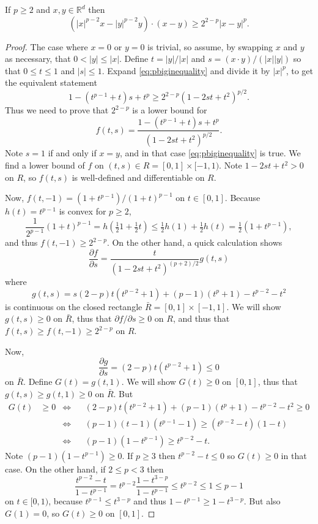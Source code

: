\documentclass[final,leqno,onefignum,onetabnum]{siamltex1213bueler}
\newcommand\RR{\mathbb{R}}
\begin{document}
\begin{lemma}  \label{lem:pbiginequality}  If $p\ge 2$ and $x,y\in\RR^d$ then
\begin{equation}
\left(|x|^{p-2} x - |y|^{p-2} y\right)\cdot(x-y) \ge 2^{2-p} |x-y|^p. \label{eq:pbiginequality}
\end{equation}
\end{lemma}

\begin{proof}  The case where $x=0$ or $y=0$ is trivial, so assume, by swapping $x$ and $y$ as necessary, that $0 < |y| \le |x|$.  Define $t=|y|/|x|$ and $s = (x\cdot y)/(|x||y|)$ so that $0\le t \le 1$ and $|s|\le 1$.  Expand \eqref{eq:pbiginequality} and divide it by $|x|^p$, to get the equivalent statement
    $$1 - (t^{p-1}+t) s + t^p \ge 2^{2-p} \left(1 - 2 s t + t^2\right)^{p/2}.$$
Thus we need to prove that $2^{2-p}$ is a lower bound for
	$$f(t,s) = \frac{1 - (t^{p-1}+t) s + t^p}{\left(1 - 2 s t + t^2\right)^{p/2}}.$$
Note $s=1$ if and only if $x=y$, and in that case \eqref{eq:pbiginequality} is true.  We find a lower bound of $f$ on $(t,s) \in R=[0,1]\times[-1,1)$.  Note $1-2st+t^2 > 0$ on $ R$, so $f(t,s)$ is well-defined and differentiable on $R$.

Now, $f(t,-1) = \left(1 + t^{p-1}\right) / \left(1 + t\right)^{p-1}$ on $t\in[0,1]$.  Because $h(t)=t^{p-1}$ is convex for $p \ge 2$,
    $$\frac{1}{2^{p-1}} (1+t)^{p-1} = h(\tfrac{1}{2} 1 + \tfrac{1}{2} t) \le \tfrac{1}{2} h(1) + \tfrac{1}{2} h(t) = \tfrac{1}{2} (1 + t^{p-1}),$$
and thus $f(t,-1) \ge 2^{2-p}$.  On the other hand, a quick calculation shows
    $$\frac{\partial f}{\partial s} = \frac{t}{\left(1 - 2 s t + t^2\right)^{(p+2)/2}} g(t,s)$$
where
    $$g(t,s) = s(2-p) t (t^{p-2} + 1) + (p-1) (t^p+1) - t^{p-2} - t^2$$
is continuous on the closed rectangle $\bar R = [0,1]\times[-1,1]$.  We will show $g(t,s)\ge 0$ on $\bar R$, thus that $\partial f/\partial s \ge 0$ on $R$, and thus that $f(t,s)\ge f(t,-1) \ge  2^{2-p}$ on $R$.

Now,
    $$\frac{\partial g}{\partial s} = (2-p) t (t^{p-2} + 1) \le 0$$
on $\bar R$.  Define $G(t) = g(t,1)$.  We will show $G(t)\ge 0$ on $[0,1]$, thus that $g(t,s)\ge g(t,1)\ge 0$ on $\bar R$.  But
\begin{align*}
G(t) &\ge 0 &\iff && (2-p) t (t^{p-2} + 1) + (p-1) (t^p+1) - t^{p-2} - t^2 \ge 0 \\
          & &\iff && (p-1) (t-1) (t^{p-1}-1) \ge (t^{p-2} - t) (1 - t)  \\
          & &\iff && (p-1) (1 - t^{p-1}) \ge t^{p-2} - t.
\end{align*}
Note $(p-1) (1 - t^{p-1}) \ge 0$.  If $p\ge 3$ then $t^{p-2} - t \le 0$ so $G(t)\ge 0$ in that case.  On the other hand, if $2\le p < 3$ then
	$$\frac{t^{p-2} - t}{1 - t^{p-1}} = t^{p-2} \frac{1 - t^{3-p}}{1 - t^{p-1}} \le t^{p-2} \le 1 \le p-1$$
on $t\in[0,1)$, because $t^{p-1}\le t^{3-p}$ and thus $1 - t^{p-1} \ge 1 - t^{3-p}$.  But also $G(1)=0$, so $G(t)\ge 0$ on $[0,1]$. \end{proof}
\end{document}
